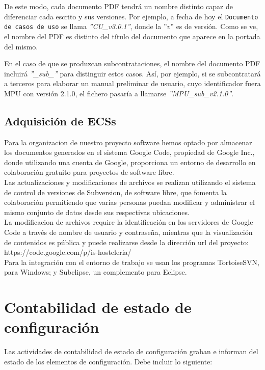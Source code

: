 \documentclass[spanish,a4paper,11pt, twoside]{report}	%
\begin{document}
		De este modo, cada documento PDF tendrá un nombre distinto capaz de diferenciar cada escrito y sus versiones. Por ejemplo, a fecha de hoy el \texttt{Documento de casos de uso} se llama \textit{''CU\_v3.0.1''}, donde la ''$v$'' es de versión. Como se ve, el nombre del PDF es distinto del título del documento que aparece en la portada del mismo.

		En el caso de que se produzcan subcontrataciones, el nombre del documento PDF incluirá \textit{''\_sub\_''} para distinguir estos casos. Así, por ejemplo, si se subcontratará a terceros para elaborar un manual preliminar de usuario, cuyo identificador fuera MPU con versión 2.1.0, el fichero pasaría a llamarse \textit{''MPU\_sub\_v2.1.0''}.

		\subsection{Adquisición de ECSs}
		Para la organizacion de nuestro proyecto software hemos optado por almacenar los documentos generados en el sistema Google Code, propiedad de Google Inc., donde utilizando una cuenta de Google, proporciona un entorno de desarrollo en colaboración gratuito para proyectos de software libre.\\

Las actualizaciones y modificaciones de archivos se realizan utilizando el sistema de control de versiones de Subversion, de software libre, que fomenta la colaboración permitiendo que varias personas puedan modificar y administrar el mismo conjunto de datos desde sus respectivas ubicaciones.\\

La modificacion de archivos require la identificación en los servidores de Google Code a través de nombre de usuario y contraseña, mientras que la visualización de contenidos es pública y puede realizarse desde la dirección url del proyecto: https://code.google.com/p/is-hosteleria/ \\

Para la integración con el entorno de trabajo se usan los programas TortoiseSVN, para Windows; y Subclipse, un complemento para Eclipse.


	\section{Contabilidad de estado de configuración}

	Las actividades de contabilidad de estado de configuración graban e informan del estado de los elementos de configuración. Debe incluir lo siguiente:
\end{document}
